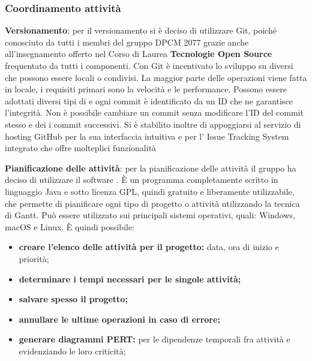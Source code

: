 \subsubsection{Coordinamento attività}
\begin{description}
\item{\textbf{Versionamento}}: per il versionamento si è deciso di utilizzare Git, poiché conosciuto da tutti i membri del gruppo DPCM 2077 grazie anche all'insegnamento offerto
nel Corso di Laurea \textbf{Tecnologie Open Source} frequentato da tutti i componenti. Con Git è incentivato lo sviluppo su  diversi che possono essere locali o condivisi.
La maggior parte delle operazioni viene fatta in locale, i requisiti primari sono la velocità e le performance.
Possono essere adottati diversi tipi di  e ogni commit è identificato da un ID che ne garantisce l'integrità.
Non è possibile cambiare un commit senza modificare l’ID del commit stesso e dei i commit successivi.  
Si è stabilito inoltre di appoggiarsi al servizio di hosting GitHub per la sua interfaccia intuitiva e per l' Issue Tracking System integrato che offre molteplici funzionalità

\item{\textbf{Pianificazione delle attività}}:  per la pianificazione delle attività il gruppo ha deciso di utilizzare il software \textbf{}. 
È un programma completamente scritto in linguaggio Java e sotto licenza GPL, quindi gratuito e liberamente utilizzabile, che permette di pianificare ogni tipo di progetto o attività utilizzando la tecnica di Gantt.
Può essere utilizzato sui principali sistemi operativi, quali: Windows, macOS e Linux.
È quindi possibile:
\begin{itemize}
\item{\textbf{creare l'elenco delle attività per il progetto:} data, ora di inizio e priorità;}
\item{\textbf{determinare i tempi necessari per le singole attività;}}
\item{\textbf{salvare spesso il progetto;}}
\item{\textbf{annullare le ultime operazioni in caso di errore;}}
\item{\textbf{generare diagrammi PERT:} per le dipendenze temporali fra attività e evidenziando le loro criticità;}
\end{itemize} 


\end{description}
